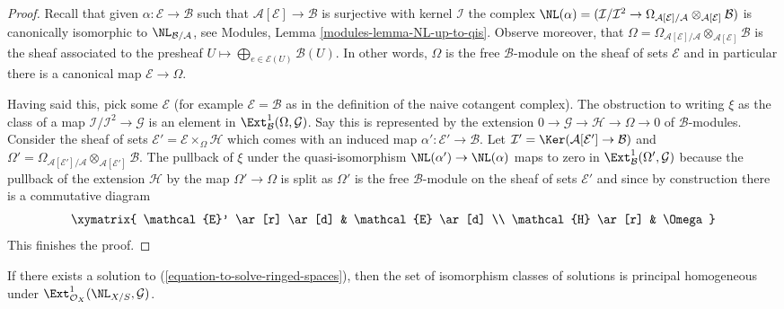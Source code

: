\begin{proof}
Recall that given $\alpha : \mathcal{E} \to \mathcal{B}$
such that $\mathcal{A}[\mathcal{E}] \to \mathcal{B}$ is surjective
with kernel $\mathcal{I}$ the complex
$\NL(\alpha) = (\mathcal{I}/\mathcal{I}^2 \to 
\Omega_{\mathcal{A}[\mathcal{E}]/\mathcal{A}}
\otimes_{\mathcal{A}[\mathcal{E}]} \mathcal{B})$ is canonically
isomorphic to $\NL_{\mathcal{B}/\mathcal{A}}$, see
Modules, Lemma \ref{modules-lemma-NL-up-to-qis}.
Observe moreover, that
$\Omega = \Omega_{\mathcal{A}[\mathcal{E}]/\mathcal{A}}
\otimes_{\mathcal{A}[\mathcal{E}]} \mathcal{B}$ is the sheaf
associated to the presheaf
$U \mapsto \bigoplus_{e \in \mathcal{E}(U)} \mathcal{B}(U)$.
In other words, $\Omega$ is the free $\mathcal{B}$-module on the
sheaf of sets $\mathcal{E}$ and in particular there is a canonical
map $\mathcal{E} \to \Omega$.

\medskip\noindent
Having said this, pick some $\mathcal{E}$ (for example
$\mathcal{E} = \mathcal{B}$ as in the definition of the naive cotangent
complex). The obstruction to writing $\xi$ as the class of a map
$\mathcal{I}/\mathcal{I}^2 \to \mathcal{G}$ is an element in
$\Ext^1_\mathcal{B}(\Omega, \mathcal{G})$. Say this is represented
by the extension $0 \to \mathcal{G} \to \mathcal{H} \to \Omega \to 0$
of $\mathcal{B}$-modules. Consider the sheaf of sets
$\mathcal{E}' = \mathcal{E} \times_\Omega \mathcal{H}$
which comes with an induced map $\alpha' : \mathcal{E}' \to \mathcal{B}$.
Let $\mathcal{I}' = \Ker(\mathcal{A}[\mathcal{E}'] \to \mathcal{B})$
and $\Omega' = \Omega_{\mathcal{A}[\mathcal{E}']/\mathcal{A}}
\otimes_{\mathcal{A}[\mathcal{E}']} \mathcal{B}$.
The pullback of $\xi$ under the quasi-isomorphism
$\NL(\alpha') \to \NL(\alpha)$ maps to zero in
$\Ext^1_\mathcal{B}(\Omega', \mathcal{G})$
because the pullback of the extension $\mathcal{H}$
by the map $\Omega' \to \Omega$ is split as $\Omega'$ is the free
$\mathcal{B}$-module on the sheaf of sets $\mathcal{E}'$ and since
by construction there is a commutative diagram
$$
\xymatrix{
\mathcal{E}' \ar[r] \ar[d] & \mathcal{E} \ar[d] \\
\mathcal{H} \ar[r] & \Omega
}
$$
This finishes the proof.
\end{proof}

\begin{lemma}
\label{lemma-choices-ringed-spaces}
If there exists a solution to (\ref{equation-to-solve-ringed-spaces}),
then the set of isomorphism classes of solutions is principal homogeneous
under $\Ext^1_{\mathcal{O}_X}(\NL_{X/S}, \mathcal{G})$.
\end{lemma}

